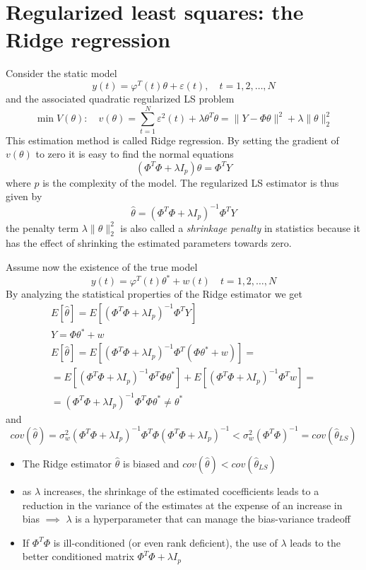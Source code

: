 \documentclass{book}
\begin{document}
\section{Regularized least squares: the Ridge regression}
Consider the static model 
\[
  y(t)=\varphi^T(t)\theta+\varepsilon(t),\quad t=1,2,\dots,N
\]
and the associated quadratic regularized LS problem 
\[
  \min V(\theta): \quad v(\theta)=\displaystyle\sum_{t=1}^{N}\varepsilon^2(t)+\lambda\theta^T\theta=\|Y-\Phi\theta\|^2+\lambda\|\theta\|_2^2
\]
This estimation method is called Ridge regression. By setting the gradient of $v(\theta)$ to zero it is easy to find the normal equations 
\[
    (\Phi^T\Phi+\lambda I_p)\theta=\Phi^TY
\]
where $p$ is the complexity of the model. The regularized LS estimator is thus given by 
\[
    \hat{\theta}=(\Phi^T\Phi+\lambda I_p)^{-1}\Phi^TY
\]
the penalty term $\lambda\|\theta\|_2^2$ is also called a \emph{shrinkage penalty} in statistics because it has the effect of shrinking the estimated parameters towards zero. 

Assume now the existence of the true model 
\[
    y(t)=\varphi^T(t)\theta^*+w(t) \quad t=1,2,\dots,N
\]
By analyzing the statistical properties of the Ridge estimator we get
\begin{gather*}
    E[\hat{\theta}]=E[(\Phi^T\Phi+\lambda I_p)^{-1}\Phi^TY]\\
    Y=\Phi\theta^*+w\\
    E[\hat{\theta}]=E[(\Phi^T\Phi+\lambda I_p)^{-1}\Phi^T(\Phi\theta^*+w)]=\\
    =E[(\Phi^T\Phi+\lambda I_p)^{-1}\Phi^T\Phi\theta^*]+E[(\Phi^T\Phi+\lambda I_p)^{-1}\Phi^Tw]=\\
    =(\Phi^T\Phi+\lambda I_p)^{-1}\Phi^T\Phi\theta^*\neq \theta^*
\end{gather*}
and 
\[
    cov(\hat{\theta})=\sigma_w^2(\Phi^T\Phi+\lambda I_p)^{-1}\Phi^T\Phi(\Phi^T\Phi+\lambda I_p)^{-1}<\sigma_w^2(\Phi^T\Phi)^{-1}=cov(\hat{\theta}_{LS})
\]
\begin{itemize}
    \item The Ridge estimator $\hat{\theta}$ is biased and $cov(\hat{\theta})<cov(\hat{\theta}_{LS})$
    \item as $\lambda$ increases, the shrinkage of the estimated cocefficients leads to a reduction in the variance of the estimates at the expense of an increase in bias $\implies$ $\lambda$ is a hyperparameter that can manage the bias-variance tradeoff
    \item If $\Phi^T\Phi$ is ill-conditioned (or even rank deficient), the use of $\lambda$ leads to the better conditioned matrix $\Phi^T\Phi+\lambda I_p$
\end{itemize}
\end{document}
